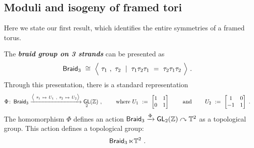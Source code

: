 \documentclass{amsart}
\theoremstyle{definition}
\theoremstyle{remark}
\newcommand{\bit}[1]{\textbf{\textit{#1}}}
\newcommand{\lacts}{\curvearrowright}
\newcommand{\lag}{\langle}
\newcommand{\rag}{\rangle}
\newcommand{\xra}{\xrightarrow}
\DeclareMathOperator{\Braid}{{\sf Braid}_3}
\DeclareMathOperator{\GL}{\sf GL}
\begin{document}
\subsection{Moduli and isogeny of framed tori}
Here we state our first result, which identifies the entire symmetries of a framed torus.  



The \bit{braid group on 3 strands} can be presented as
\begin{equation}
\label{e67}
\Braid 
~\cong~
\Bigl \lag~ \tau_{1}~,~ \tau_{2}~ \mid ~ \tau_{1}\tau_{2}\tau_{1} ~=~ \tau_{2} \tau_{1} \tau_{2} ~\Bigr\rag
~.
\end{equation}
Through this presentation, there is a standard representation
\begin{equation}
\label{e63}
\Phi
\colon
\Braid
\xra{\bigl\lag~\tau_{1} ~\mapsto ~U_1~,~\tau_{2} ~ \mapsto ~U_2  \bigr\rag}
\GL_2(\ZZ)
~,
\qquad
\text{ where }
U_1
~:=~
\begin{bmatrix} 
1 & 1
\\
0 & 1
\end{bmatrix}
\qquad
\text{ and }
\qquad
U_2~:=~
\begin{bmatrix} 
1 & 0
\\
-1 & 1
\end{bmatrix}
~.
\end{equation}
The homomorphism $\Phi$ defines an action $\Braid \xra{\Phi} \GL_2(\ZZ) \lacts \TT^2$
as a topological group.  
This action defines a topological group:
\[
\Braid \ltimes \TT^2
~.
\]
\end{document}

